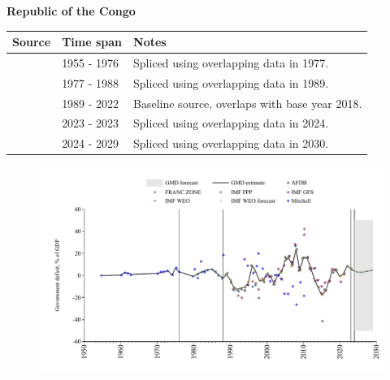 \documentclass[12pt,a4paper,landscape]{article}
\begin{document}
\begin{adjustbox}{max totalsize={\paperwidth}{\paperheight},center}
\begin{minipage}[t][\textheight][t]{\textwidth}
\vspace*{0.5cm}
{}
\begin{center}
{\Large\bfseries Republic of the Congo}
\end{center}
\vspace{0.5cm}
\begin{table}[H]
\centering
\small
\begin{tabular}{|l|l|l|}
\hline
\textbf{Source} & \textbf{Time span} & \textbf{Notes} \\
\hline
\rowcolor{white}\cite{Mitchell}& 1955 - 1976 &Spliced using overlapping data in 1977.\\
\rowcolor{lightgray}\cite{AFDB}& 1977 - 1988 &Spliced using overlapping data in 1989.\\
\rowcolor{white}\cite{IMF_WEO}& 1989 - 2022 &Baseline source, overlaps with base year 2018.\\
\rowcolor{lightgray}\cite{IMF_FPP}& 2023 - 2023 &Spliced using overlapping data in 2024.\\
\rowcolor{white}\cite{IMF_WEO_forecast}& 2024 - 2029 &Spliced using overlapping data in 2030.\\
\hline
\end{tabular}
\end{table}
\begin{figure}[H]
\centering
\includegraphics[width=\textwidth,height=0.6\textheight,keepaspectratio]{graphs/COG_govdef_GDP.pdf}
\end{figure}
\end{minipage}
\end{adjustbox}
\end{document}
